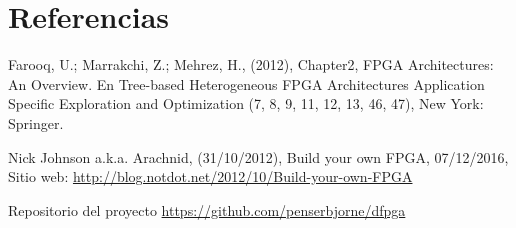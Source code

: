 \documentclass[12pt]{article}
\begin{document}
\section{Referencias}
\begin{thebibliography}{}

  Farooq, U.; Marrakchi, Z.; Mehrez, H.,
  (2012),
  Chapter2, FPGA Architectures: An Overview. En Tree-based Heterogeneous FPGA Architectures Application Specific Exploration and Optimization (7, 8, 9, 11, 12, 13, 46, 47),
  New York: Springer.

  Nick Johnson a.k.a. Arachnid,
  (31/10/2012),
  Build your own FPGA,
  07/12/2016,
  Sitio web: \url{http://blog.notdot.net/2012/10/Build-your-own-FPGA}

  Repositorio del proyecto \url{https://github.com/penserbjorne/dfpga}
\end{thebibliography}



\end{document}
